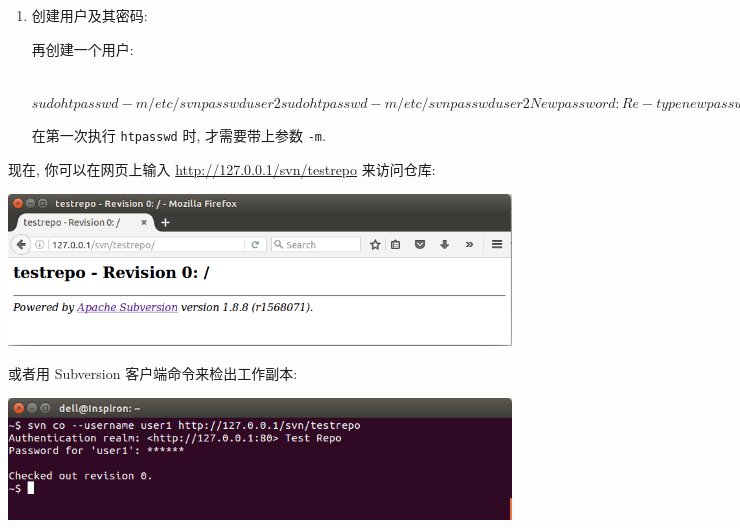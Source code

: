 \documentclass[nofonts, oneside]{ctexart}
\begin{document}
\begin{enumerate}
  \item 创建用户及其密码:
    再创建一个用户:
\begin{svnshell}
~$ sudo htpasswd -m /etc/svnpasswd user2
sudo htpasswd -m /etc/svnpasswd user2
New password: 
Re-type new password: 
Adding password for user user2
svn$ 

\end{svnshell}
    在第一次执行 \texttt{htpasswd} 时, 才需要带上参数 \texttt{-m}.
\end{enumerate}

现在, 你可以在网页上输入 \url{http://127.0.0.1/svn/testrepo} 来访问仓库:
\begin{center}
    \includegraphics[scale=0.55]{./images/webtestrepo.png}
\end{center}
或者用 Subversion 客户端命令来检出工作副本:
\begin{center}
    \includegraphics[scale=0.6]{./images/terminalrepo.png}
\end{center}


\printindex
\end{document}
